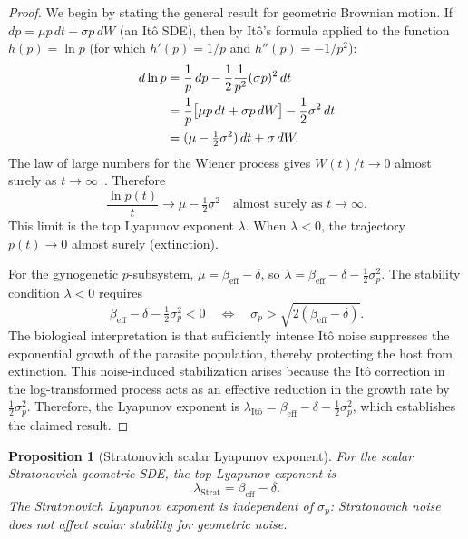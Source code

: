 \documentclass[12pt]{article}
\newtheorem{proposition}{Proposition}
\begin{document}
\begin{proof}
We begin by stating the general result for geometric Brownian motion.  If $dp = \mu p\,dt + \sigma p\,dW$ (an It\^{o} SDE), then by It\^{o}'s formula applied to the function $h(p) = \ln p$ (for which $h'(p) = 1/p$ and $h''(p) = -1/p^2$):
\begin{align}
  d\ln p &= \frac{1}{p}\,dp - \frac{1}{2}\frac{1}{p^2}(\sigma p)^2\,dt \notag \\
         &= \frac{1}{p}\bigl[\mu p\,dt + \sigma p\,dW\bigr] - \frac{1}{2}\sigma^2\,dt \notag \\
         &= (\mu - \tfrac{1}{2}\sigma^2)\,dt + \sigma\,dW.
\end{align}
The law of large numbers for the Wiener process gives $W(t)/t \to 0$ almost surely as $t \to \infty$~\citep{Oksendal2003}.  Therefore
\begin{equation}
  \frac{\ln p(t)}{t} \to \mu - \tfrac{1}{2}\sigma^2 \quad \text{almost surely as } t \to \infty.
\end{equation}
This limit is the top Lyapunov exponent $\lambda$.  When $\lambda < 0$, the trajectory $p(t) \to 0$ almost surely (extinction).

For the gynogenetic $p$-subsystem, $\mu = \beta_{\text{eff}} - \delta$, so $\lambda = \beta_{\text{eff}} - \delta - \tfrac{1}{2}\sigma_p^2$.  The stability condition $\lambda < 0$ requires
\begin{equation}
  \beta_{\text{eff}} - \delta - \tfrac{1}{2}\sigma_p^2 < 0 \quad \Longleftrightarrow \quad \sigma_p > \sqrt{2(\beta_{\text{eff}} - \delta)}.
\end{equation}
The biological interpretation is that sufficiently intense It\^{o} noise suppresses the exponential growth of the parasite population, thereby protecting the host from extinction.  This noise-induced stabilization arises because the It\^{o} correction in the log-transformed process acts as an effective reduction in the growth rate by $\tfrac{1}{2}\sigma_p^2$.  Therefore, the Lyapunov exponent is $\lambda_{\text{It\^{o}}} = \beta_{\text{eff}} - \delta - \tfrac{1}{2}\sigma_p^2$, which establishes the claimed result.
\end{proof}

\begin{proposition}[Stratonovich scalar Lyapunov exponent]\label{prop:lyap_strat}
For the scalar Stratonovich geometric SDE, the top Lyapunov exponent is
\begin{equation}
  \lambda_{\text{Strat}} = \beta_{\text{eff}} - \delta.
\end{equation}
The Stratonovich Lyapunov exponent is independent of $\sigma_p$: Stratonovich noise does not affect scalar stability for geometric noise.
\end{proposition}
\end{document}
